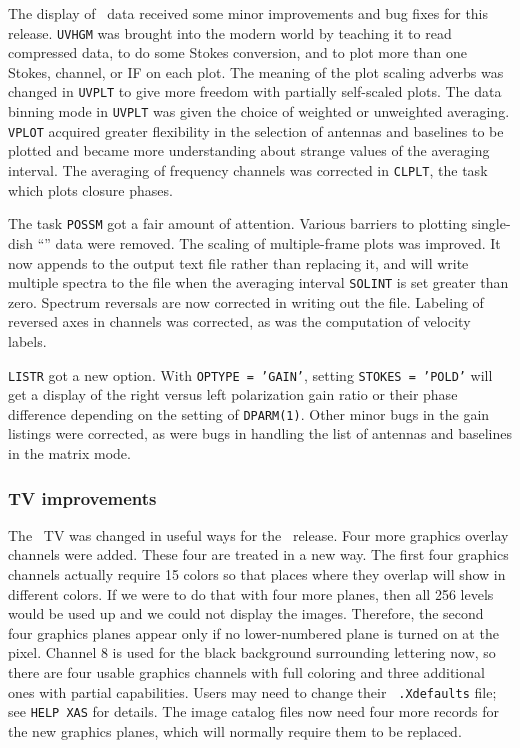 The display of \uv\ data received some minor improvements and bug
fixes for this release.  {\tt UVHGM} was brought into the modern world
by teaching it to read compressed data, to do some Stokes conversion,
and to plot more than one Stokes, channel, or IF on each plot.  The
meaning of the plot scaling adverbs was changed in {\tt UVPLT} to give
more freedom with partially self-scaled plots.  The data binning mode
in {\tt UVPLT} was given the choice of weighted or unweighted
averaging.  {\tt VPLOT} acquired greater flexibility in the selection
of antennas and baselines to be plotted and became more understanding
about strange values of the averaging interval.  The averaging of
frequency channels was corrected in {\tt CLPLT}, the task which plots
closure phases.

The task {\tt POSSM} got a fair amount of attention.  Various barriers
to plotting single-dish ``\uv'' data were removed.  The scaling of
multiple-frame plots was improved.  It now appends to the output text
file rather than replacing it, and will write multiple spectra to the
file when the averaging interval {\tt SOLINT} is set greater than zero.
Spectrum reversals are now corrected in writing out the file.
Labeling of reversed axes in channels was corrected, as was the
computation of velocity labels.

{\tt LISTR} got a new option.  With {\tt OPTYPE = 'GAIN'}, setting
{\tt STOKES = 'POLD'} will get a display of the right versus left
polarization gain ratio or their phase difference depending on the
setting of \hbox{{\tt DPARM(1)}}.  Other minor bugs in the gain
listings were corrected, as were bugs in handling the list of antennas
and baselines in the matrix mode.

\subsubsection{TV improvements}

The \AIPS\ TV was changed in useful ways for the \RELEASENAME\
release.  Four more graphics overlay channels were added.  These four
are treated in a new way.  The first four graphics channels actually
require 15 colors so that places where they overlap will show in
different colors.  If we were to do that with four more planes, then
all 256 levels would be used up and we could not display the images.
Therefore, the second four graphics planes appear only if no
lower-numbered plane is turned on at the pixel.  Channel 8 is used for
the black background surrounding lettering now, so there are four
usable graphics channels with full coloring and three additional ones
with partial capabilities.  Users may need to change their {\tt
.Xdefaults} file; see {\tt HELP XAS} for details.  The image catalog
files now need four more records for the new graphics planes, which
will normally require them to be replaced.

